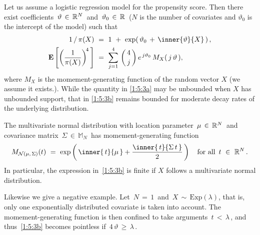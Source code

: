 \begin{example*}
  Let us assume a logistic regression model for the propensity score.
  Then there exist coefficients $\,\vartheta \,\in\,  \mathbb{R}^N\,$ and $\,\vartheta_0\,\in\, \mathbb{R}\,$ ($N$ is the number of covariates and $\vartheta_0$ is the intercept of the model) such that
  \begin{align}
    \label{1:5:3a}
    1\,/\,\pi(X)
    &
    \ 
    =
    \ 
    1
    \ 
    +
    \ 
    \exp(
    \,
    \vartheta_0
    \, 
    +
    \,
    \inner{\vartheta}{X}
    \,
    )
    \,,
    \\
    \label{1:5:3b}
  \E \left[ 
    \left(
      \frac{1}{\pi(X)}
    \right)^{\!4}
    \,
  \right]
    &
    \ 
    =
    \ 
  \sum_{j=1}^{4} 
  \,
    \binom{\,4\,}{j}
    \,
    e^{\,j \vartheta_0}
    \,
    M_X(\,j\,\vartheta\,)
    ,
  \end{align}
  where $M_X$ is the momement-generating function of the random vector $X$ (we assume it exists.).
   While the quantity in \eqref{1:5:3a}
   may be unbounded when $X$ has unbounded support, that in \eqref{1:5:3b} remains bounded for moderate decay rates of the
   underlying distribution.

   The multivariate normal distribution with location parameter $\,\mu\,\in\,\mathbb{R}^N\,$ and covariance matrix 
   $\,\Sigma\,\in\, \mathbb{M}_N\,$ has momement-generating function
   \begin{gather*}
     M_{\mathcal{N}(\mu,\,\Sigma)}
     (t)
     \ 
     =
     \ 
     \exp
     \left( 
       \,
       \inner{\,t}{\mu\,}
       +
       \frac{
       \inner{\,t}{\Sigma \,t\,}
       }{2}
       \,
     \right)
     \quad
     \text{for all}\ 
     \,t\ \in\ \R^N
     \,.
   \end{gather*}
   In particular, the expression in~\eqref{1:5:3b} is finite if $X$ follows a multivariate normal distribution.

   Likewise we give a negative example.
   Let $\,N\,=\,1\,$ and $\,X\,\sim\, \mathrm{Exp}(\lambda)$, that is, only one exponentially distributed covariate is taken into account.
   The momement-generating function is then confined to take arguments $\,t\,<\,\lambda\,$, and thus~\eqref{1:5:3b} becomes pointless if $\,4\,\vartheta\,\ge\, \lambda\,$.
\end{example*}

